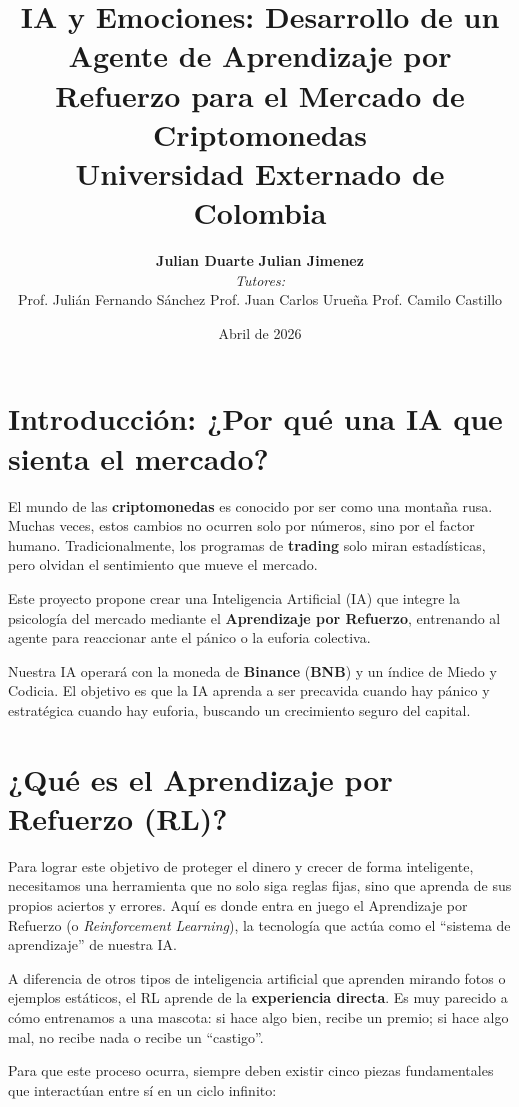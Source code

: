 \documentclass[12pt,a4paper]{article}
\title{
    \vspace{-1cm}
    \textbf{\Large IA y Emociones: Desarrollo de un Agente de Aprendizaje por Refuerzo para el Mercado de Criptomonedas} \\
    \vspace{0.5cm}
    \large Universidad Externado de Colombia \\
    \text{Ciencia de Datos -- Departamento de Matemáticas}
}
\author{
    \textbf{Julian Duarte} \quad \textbf{Julian Jimenez} \\
    \medskip
    \small \textit{Tutores:} \\
    \small Prof. Julián Fernando Sánchez \quad Prof. Juan Carlos Urueña \quad Prof. Camilo Castillo
}
\date{Abril de 2026}
\begin{document}
\maketitle

\tableofcontents
\newpage

\section{Introducción: ¿Por qué una IA que sienta el mercado?}

El mundo de las \textbf{criptomonedas} es conocido por ser como una montaña rusa. Muchas veces, estos cambios no ocurren solo por números, sino por el factor humano. Tradicionalmente, los programas de \textbf{trading} solo miran estadísticas, pero olvidan el sentimiento que mueve el mercado.

Este proyecto propone crear una Inteligencia Artificial (IA) que integre la psicología del mercado mediante el \textbf{Aprendizaje por Refuerzo}, entrenando al agente para reaccionar ante el pánico o la euforia colectiva.

Nuestra IA operará con la moneda de \textbf{Binance} (\textbf{BNB}) y un índice de Miedo y Codicia. El objetivo es que la IA aprenda a ser precavida cuando hay pánico y estratégica cuando hay euforia, buscando un crecimiento seguro del capital.

\section{¿Qué es el Aprendizaje por Refuerzo (RL)?}

Para lograr este objetivo de proteger el dinero y crecer de forma inteligente, necesitamos una herramienta que no solo siga reglas fijas, sino que aprenda de sus propios aciertos y errores. Aquí es donde entra en juego el Aprendizaje por Refuerzo (o \textit{Reinforcement Learning}), la tecnología que actúa como el ``sistema de aprendizaje'' de nuestra IA.

A diferencia de otros tipos de inteligencia artificial que aprenden mirando fotos o ejemplos estáticos, el RL aprende de la \textbf{experiencia directa}. Es muy parecido a cómo entrenamos a una mascota: si hace algo bien, recibe un premio; si hace algo mal, no recibe nada o recibe un ``castigo''.

Para que este proceso ocurra, siempre deben existir cinco piezas fundamentales que interactúan entre sí en un ciclo infinito:
\end{document}
